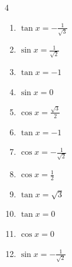 \begin{multicols}{4}
\begin{enumerate}
  \item $\displaystyle \tan{x}  = -\frac{1}{\sqrt{3}}$


  \item $\displaystyle \sin{x}  = \frac{1}{\sqrt{2}}$


  \item $\displaystyle \tan{x}  = -1$


  \item $\displaystyle \sin{x}  = 0$

        \phantom{$\displaystyle x = 0 , \pi$}

  \item $\displaystyle \cos{x}  = \frac{\sqrt{3}}{2}$


  \item $\displaystyle \tan{x}  = -1$


  \item $\displaystyle \cos{x}  = -\frac{1}{\sqrt{2}}$


  \item $\displaystyle \cos{x}  = \frac{1}{2}$


  \item $\displaystyle \tan{x}  = \sqrt{3}$


  \item $\displaystyle \tan{x}  = 0$

        \phantom{$\displaystyle x = 0 , \pi$}

  \item $\displaystyle \cos{x}  = 0$


  \item $\displaystyle \sin{x}  = -\frac{1}{\sqrt{2}}$


\end{enumerate}
\end{multicols}
